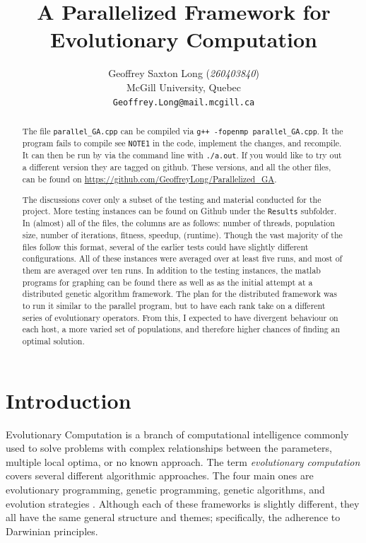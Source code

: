 \documentclass[10pt,letterpaper]{article}
\begin{document}
\title{A Parallelized Framework for Evolutionary Computation}

\author{
	Geoffrey Saxton Long (\textit{260403840})\\
	McGill University, Quebec \\
	{\tt\small Geoffrey.Long@mail.mcgill.ca}
}

\maketitle

\begin{abstract}
The file \texttt{parallel\_GA.cpp} can be compiled via \texttt{g++ -fopenmp parallel\_GA.cpp}. It the program fails to compile see \texttt{NOTE1} in the code, implement the changes, and recompile. It can then be run by via the command line with \texttt{./a.out}. If you would like to try out a different version they are tagged on github. These versions, and all the other files, can be found on \url{https://github.com/GeoffreyLong/Parallelized_GA}.

The discussions cover only a subset of the testing and material conducted for the project. More testing instances can be found on Github under the \texttt{Results} subfolder. In (almost) all of the files, the columns are as follows: number of threads, population size, number of iterations, fitness, speedup, (runtime). Though the vast majority of the files follow this format, several of the earlier tests could have slightly different configurations. All of these instances were averaged over at least five runs, and most of them are averaged over ten runs. In addition to the testing instances, the matlab programs for graphing can be found there as well as as the initial attempt at a distributed genetic algorithm framework. The plan for the distributed framework was to run it similar to the parallel program, but to have each rank take on a different series of evolutionary operators. From this, I expected to have divergent behaviour on each host, a more varied set of populations, and therefore higher chances of finding an optimal solution.
\end{abstract}


\newpage
\section{Introduction}
Evolutionary Computation is a branch of computational intelligence commonly used to solve problems with complex relationships between the parameters, multiple local optima, or no known approach. The term \textit{evolutionary computation} covers several different algorithmic approaches. The four main ones are evolutionary programming, genetic programming, genetic algorithms, and evolution strategies \cite{ecomp}. Although each of these frameworks is slightly different, they all have the same general structure and themes; specifically, the adherence to Darwinian principles.
\end{document}
